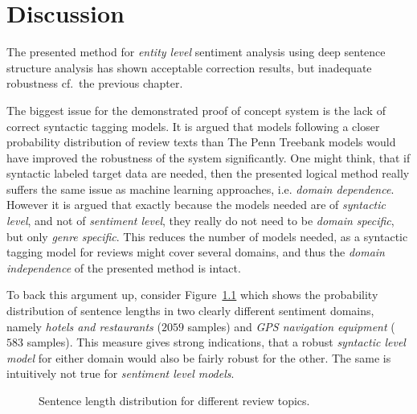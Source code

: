 
\chapter{Discussion}
\label{chap:discussion}

The presented method for \emph{entity level} sentiment analysis using deep sentence structure analysis has shown acceptable correction results, but inadequate robustness cf.\ the previous chapter.

The biggest issue for the demonstrated proof of concept system is the lack of correct syntactic tagging models. It is argued that models following a closer probability distribution of review texts than The Penn Treebank models would have improved the robustness of the system significantly. One might think, that if syntactic labeled target data are needed, then the presented logical method really suffers the same issue as machine learning approaches, i.e. \emph{domain dependence}. However it is argued that exactly because the models needed are of \emph{syntactic level}, and not of \emph{sentiment level}, they really do not need to be \emph{domain specific}, but only \emph{genre specific}. This reduces the number of models needed, as a syntactic tagging model for reviews might cover several domains, and thus the \emph{domain independence} of the presented method is intact.

To back this argument up, consider Figure~\ref{fig:distBias2} which shows the probability distribution of sentence lengths in two clearly different sentiment domains, namely \emph{hotels and restaurants} ($\num{2059}$ samples) and \emph{GPS navigation equipment} ($\num{583}$ samples). This measure gives strong indications, that a robust \emph{syntactic level model} for either domain would also be fairly robust for the other. The same is intuitively not true for \emph{sentiment level models}.
\begin{figure}[ht]
\begin{center}
\end{center}
\vspace{-1em}
\caption{Sentence length distribution for different review topics.}
\label{fig:distBias2}
\end{figure}

